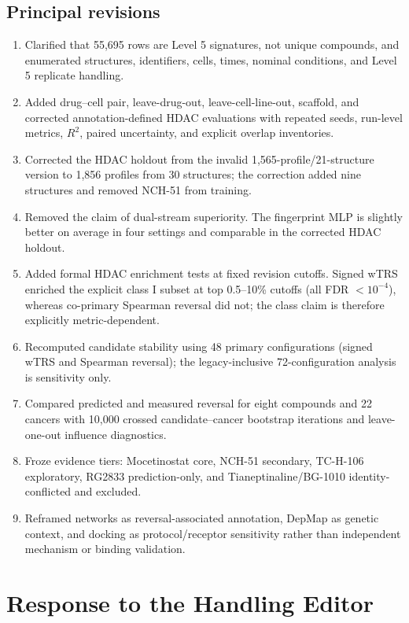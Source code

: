 \documentclass[10pt]{article}
\begin{document}
\subsection*{Principal revisions}
\begin{enumerate}[leftmargin=1.7em,itemsep=0.25em]
\item Clarified that 55,695 rows are Level 5 signatures, not unique compounds, and enumerated structures, identifiers, cells, times, nominal conditions, and Level 5 replicate handling.
\item Added drug--cell pair, leave-drug-out, leave-cell-line-out, scaffold, and corrected annotation-defined HDAC evaluations with repeated seeds, run-level metrics, $R^2$, paired uncertainty, and explicit overlap inventories.
\item Corrected the HDAC holdout from the invalid 1,565-profile/21-structure version to 1,856 profiles from 30 structures; the correction added nine structures and removed NCH-51 from training.
\item Removed the claim of dual-stream superiority. The fingerprint MLP is slightly better on average in four settings and comparable in the corrected HDAC holdout.
\item Added formal HDAC enrichment tests at fixed revision cutoffs. Signed wTRS enriched the explicit class I subset at top 0.5--10\% cutoffs (all FDR $<10^{-4}$), whereas co-primary Spearman reversal did not; the class claim is therefore explicitly metric-dependent.
\item Recomputed candidate stability using 48 primary configurations (signed wTRS and Spearman reversal); the legacy-inclusive 72-configuration analysis is sensitivity only.
\item Compared predicted and measured reversal for eight compounds and 22 cancers with 10,000 crossed candidate--cancer bootstrap iterations and leave-one-out influence diagnostics.
\item Froze evidence tiers: Mocetinostat core, NCH-51 secondary, TC-H-106 exploratory, RG2833 prediction-only, and Tianeptinaline/BG-1010 identity-conflicted and excluded.
\item Reframed networks as reversal-associated annotation, DepMap as genetic context, and docking as protocol/receptor sensitivity rather than independent mechanism or binding validation.
\end{enumerate}

\section*{Response to the Handling Editor}
\end{document}
